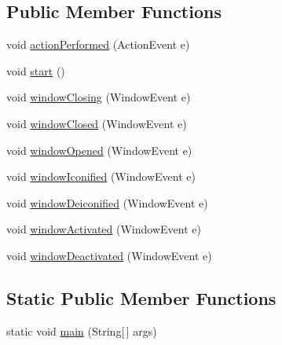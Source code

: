 \subsection*{Public Member Functions}
\begin{DoxyCompactItemize}
\item 
void \hyperlink{classgov_1_1fnal_1_1ppd_1_1dd_1_1chat_1_1MessagingServerGUI_afc6026549f5dd2a239050cc31dee565f}{action\-Performed} (Action\-Event e)
\item 
void \hyperlink{classgov_1_1fnal_1_1ppd_1_1dd_1_1chat_1_1MessagingServerGUI_a22fa59dfa28c3dc01d234eff914a910f}{start} ()
\item 
void \hyperlink{classgov_1_1fnal_1_1ppd_1_1dd_1_1chat_1_1MessagingServerGUI_a8c378f35d36b3e0f978675d582ab426c}{window\-Closing} (Window\-Event e)
\item 
void \hyperlink{classgov_1_1fnal_1_1ppd_1_1dd_1_1chat_1_1MessagingServerGUI_a30051177bf84ba3b8bb8107672e144e5}{window\-Closed} (Window\-Event e)
\item 
void \hyperlink{classgov_1_1fnal_1_1ppd_1_1dd_1_1chat_1_1MessagingServerGUI_ae92ae991433af389152dc9406042ab84}{window\-Opened} (Window\-Event e)
\item 
void \hyperlink{classgov_1_1fnal_1_1ppd_1_1dd_1_1chat_1_1MessagingServerGUI_a355d56a70306e34df0c8887b0f3786ca}{window\-Iconified} (Window\-Event e)
\item 
void \hyperlink{classgov_1_1fnal_1_1ppd_1_1dd_1_1chat_1_1MessagingServerGUI_aea0f1a0225e811ef7487ff7c5c2b6d29}{window\-Deiconified} (Window\-Event e)
\item 
void \hyperlink{classgov_1_1fnal_1_1ppd_1_1dd_1_1chat_1_1MessagingServerGUI_a29eb22434d74bb8911382b34a8ede587}{window\-Activated} (Window\-Event e)
\item 
void \hyperlink{classgov_1_1fnal_1_1ppd_1_1dd_1_1chat_1_1MessagingServerGUI_acfee1895223207911937418ccac3a23f}{window\-Deactivated} (Window\-Event e)
\end{DoxyCompactItemize}
\subsection*{Static Public Member Functions}
\begin{DoxyCompactItemize}
\item 
static void \hyperlink{classgov_1_1fnal_1_1ppd_1_1dd_1_1chat_1_1MessagingServerGUI_a82ff6dd17a7ff62adf5eb6beb619ff5e}{main} (String\mbox{[}$\,$\mbox{]} args)
\end{DoxyCompactItemize}


